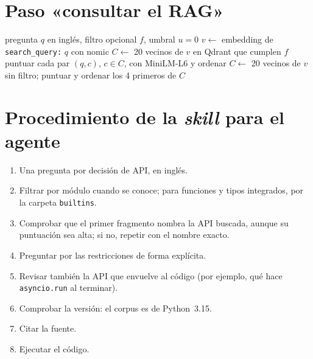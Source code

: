 \documentclass[pdflatex,sn-mathphys-num]{sn-jnl}
\begin{document}
\begin{appendices}

\section{Paso «consultar el RAG»}\label{sec:apendice-consulta}

\begin{algorithm}
\caption{Consulta del RAG con filtro opcional por módulo}\label{alg:consulta}
\begin{algorithmic}[1]
\Require pregunta $q$ en inglés, filtro opcional $f$, umbral $u = 0$
\State $v \gets$ embedding de \texttt{search\_query:} $q$ con nomic
\State $C \gets$ 20 vecinos de $v$ en Qdrant que cumplen $f$
\State puntuar cada par $(q, c)$, $c \in C$, con MiniLM-L6 y ordenar
  \State $C \gets$ 20 vecinos de $v$ sin filtro; puntuar y ordenar
\EndIf
\State \Return los 4 primeros de $C$
\end{algorithmic}
\end{algorithm}

\section{Procedimiento de la \emph{skill} para el agente}\label{sec:apendice-skill}

\begin{enumerate}
\item Una pregunta por decisión de API, en inglés.
\item Filtrar por módulo cuando se conoce; para funciones y tipos integrados, por la carpeta \texttt{builtins}.
\item Comprobar que el primer fragmento nombra la API buscada, aunque su puntuación sea alta; si no, repetir con el nombre exacto.
\item Preguntar por las restricciones de forma explícita.
\item Revisar también la API que envuelve al código (por ejemplo, qué hace \texttt{asyncio.run} al terminar).
\item Comprobar la versión: el corpus es de Python~3.15.
\item Citar la fuente.
\item Ejecutar el código.
\end{enumerate}

\end{appendices}


\end{document}
